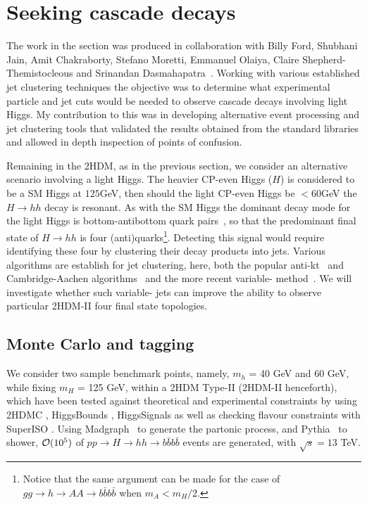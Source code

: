 \section{Seeking cascade decays}
 
The work in the section was produced in collaboration with Billy Ford, Shubhani Jain, Amit Chakraborty, Stefano Moretti, Emmanuel Olaiya, Claire Shepherd-Themistocleous and Srinandan Dasmahapatra~\cite{chakraborty2020revisiting}.
Working with various established jet clustering techniques the objective was to determine what experimental particle and jet cuts would be needed to observe cascade decays involving light Higgs.
My contribution to this was in developing alternative event processing and jet clustering tools that
validated the results obtained from the standard libraries and allowed in depth inspection of points of confusion.

Remaining in the 2HDM, as in the previous section, we consider an alternative scenario involving a light Higgs.
The heavier CP-even Higgs (\(H\)) is considered to be a SM Higgs at \(125\)GeV,
then should the light CP-even Higgs be \(< 60\)GeV the \(H\rightarrow{} hh\) decay is resonant.
As with the SM Higgs the dominant decay mode for the light Higgs is bottom-antibottom quark pairs~\cite{Moretti1994belowThreshold,Djouadi1995twoAndthree}, so that the predominant final state of \(H\rightarrow{} hh\) is four (anti)quarks\footnote{Notice that the same argument can be made for the case of $gg\to h\to AA\to b\bar b b\bar b$ when $m_A<m_H/2$.}.
Detecting this signal would require identifying these four  by clustering their decay products into jets.
Various algorithms are establish for jet clustering, here, both the popular
anti-kt~\cite{Cacciari2008akt} and Cambridge-Aachen algorithms~\cite{Wobisch1998caJet} and the
more recent variable-\stoppingdeltar{} method~\cite{Krohn2009variableR}. 
We will investigate whether such variable-\stoppingdeltar{} jets can improve the ability to observe particular 2HDM-II four  final state topologies. 

\subsection{Monte Carlo and tagging}\label{sec:dataset6040}

We consider two sample benchmark points, namely, $m_{h}$ = 40 GeV and 60 GeV, while  fixing $m_{H}$ = 125 GeV, within a 2HDM Type-II (2HDM-II henceforth), which have been tested against theoretical and experimental constraints by
using 2HDMC \cite{Eriksson20102HDMC}, HiggsBounds \cite{Bechtle2014higgsbounds4}, HiggsSignals \cite{Bechtle2014higgssignals} as well as checking flavour constraints with SuperISO \cite{Mahmoudi2008SuperIso}. 
Using Madgraph~\cite{alwall_madgraph2011} to generate the partonic process, and Pythia~\cite{sjostrand_pythia2015} to shower, ${\cal O}(10^5)$ of \(pp \rightarrow{} H \rightarrow{} hh \rightarrow{} b\bar{b}b\bar{b}\) events are generated, with $\sqrt{s}=13 $ TeV.


